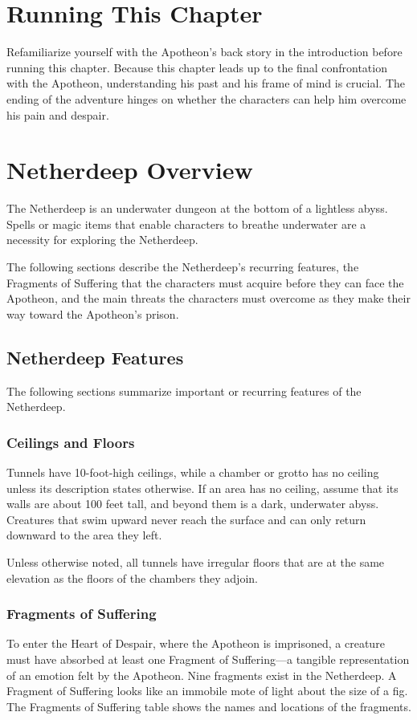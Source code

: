\documentclass[10pt,a4paper,twoside,bg=print,twocolumn,openany,nodeprecatedcode]{dndbook}
\begin{document}
\section{Running This Chapter}
Refamiliarize yourself with the Apotheon's back story in the introduction before running this chapter. Because this chapter leads up to the final confrontation with the Apotheon, understanding his past and his frame of mind is crucial. The ending of the adventure hinges on whether the characters can help him overcome his pain and despair.

\section{Netherdeep Overview}
The Netherdeep is an underwater dungeon at the bottom of a lightless abyss. Spells or magic items that enable characters to breathe underwater are a necessity for exploring the Netherdeep.

The following sections describe the Netherdeep's recurring features, the Fragments of Suffering that the characters must acquire before they can face the Apotheon, and the main threats the characters must overcome as they make their way toward the Apotheon's prison.

\subsection{Netherdeep Features}
The following sections summarize important or recurring features of the Netherdeep.

\subsubsection{Ceilings and Floors}
Tunnels have 10-foot-high ceilings, while a chamber or grotto has no ceiling unless its description states otherwise. If an area has no ceiling, assume that its walls are about 100 feet tall, and beyond them is a dark, underwater abyss. Creatures that swim upward never reach the surface and can only return downward to the area they left.

Unless otherwise noted, all tunnels have irregular floors that are at the same elevation as the floors of the chambers they adjoin.

\subsubsection{Fragments of Suffering}
To enter the Heart of Despair, where the Apotheon is imprisoned, a creature must have absorbed at least one Fragment of Suffering—a tangible representation of an emotion felt by the Apotheon. Nine fragments exist in the Netherdeep. A Fragment of Suffering looks like an immobile mote of light about the size of a fig. The Fragments of Suffering table shows the names and locations of the fragments.
\end{document}
